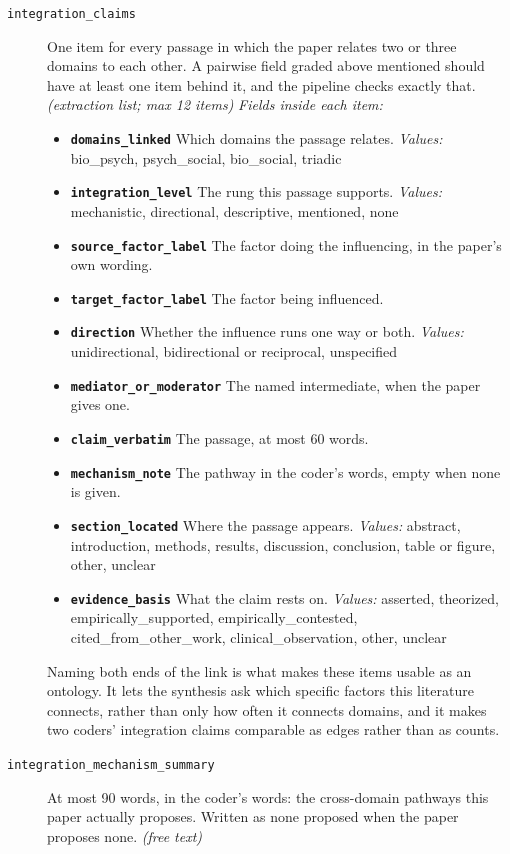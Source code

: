 \documentclass[11pt]{article}
\begin{document}
\begin{description}
\item[\texttt{integration\_claims}] One item for every passage in which the paper relates two or three domains to each other. A pairwise field graded above mentioned should have at least one item behind it, and the pipeline checks exactly that. \textit{(extraction list; max 12 items)}
  {\small\itshape Fields inside each item:}
  \begin{itemize}[leftmargin=1.3em,itemsep=1pt,topsep=2pt]
  \item \textbf{\texttt{domains\_linked}} Which domains the passage relates. {\small \textit{Values:} bio\_psych, psych\_social, bio\_social, triadic}
  \item \textbf{\texttt{integration\_level}} The rung this passage supports. {\small \textit{Values:} mechanistic, directional, descriptive, mentioned, none}
  \item \textbf{\texttt{source\_factor\_label}} The factor doing the influencing, in the paper's own wording.
  \item \textbf{\texttt{target\_factor\_label}} The factor being influenced.
  \item \textbf{\texttt{direction}} Whether the influence runs one way or both. {\small \textit{Values:} unidirectional, bidirectional or reciprocal, unspecified}
  \item \textbf{\texttt{mediator\_or\_moderator}} The named intermediate, when the paper gives one.
  \item \textbf{\texttt{claim\_verbatim}} The passage, at most 60 words.
  \item \textbf{\texttt{mechanism\_note}} The pathway in the coder's words, empty when none is given.
  \item \textbf{\texttt{section\_located}} Where the passage appears. {\small \textit{Values:} abstract, introduction, methods, results, discussion, conclusion, table or figure, other, unclear}
  \item \textbf{\texttt{evidence\_basis}} What the claim rests on. {\small \textit{Values:} asserted, theorized, empirically\_supported, empirically\_contested, cited\_from\_other\_work, clinical\_observation, other, unclear}
  \end{itemize}
{\small Naming both ends of the link is what makes these items usable as an ontology. It lets the synthesis ask which specific factors this literature connects, rather than only how often it connects domains, and it makes two coders' integration claims comparable as edges rather than as counts.}
\item[\texttt{integration\_mechanism\_summary}] At most 90 words, in the coder's words: the cross-domain pathways this paper actually proposes. Written as none proposed when the paper proposes none. \textit{(free text)}
\end{description}
\end{document}
